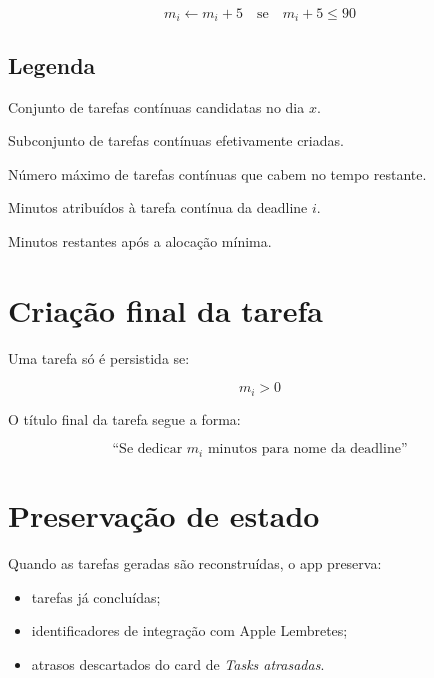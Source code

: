 \documentclass[12pt,a4paper]{article}
\begin{document}
\[
m_i \leftarrow m_i + 5
\quad \text{se} \quad
m_i + 5 \leq 90
\]

\subsection*{Legenda}

\begin{description}[leftmargin=2.2cm]
    \item[$C(x)$] Conjunto de tarefas contínuas candidatas no dia $x$.
    \item[$C_{\text{criada}}(x)$] Subconjunto de tarefas contínuas efetivamente criadas.
    \item[$K(x)$] Número máximo de tarefas contínuas que cabem no tempo restante.
    \item[$m_i$] Minutos atribuídos à tarefa contínua da deadline $i$.
    \item[$L_r(x)$] Minutos restantes após a alocação mínima.
\end{description}

\section{Criação final da tarefa}

Uma tarefa só é persistida se:

\[
m_i > 0
\]

O título final da tarefa segue a forma:

\[
\text{``Se dedicar } m_i \text{ minutos para } \text{nome da deadline}\text{''}
\]

\section{Preservação de estado}

Quando as tarefas geradas são reconstruídas, o app preserva:

\begin{itemize}
    \item tarefas já concluídas;
    \item identificadores de integração com Apple Lembretes;
    \item atrasos descartados do card de \textit{Tasks atrasadas}.
\end{itemize}
\end{document}
